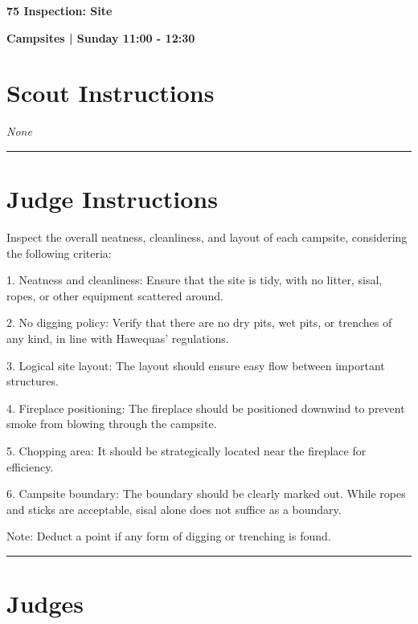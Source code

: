 \documentclass[10pt]{article}
\newcommand{\newtitle}[1]{\begin{center}{\Huge\bfseries #1 }\\ \vspace{5mm}\end{center}}
\newcommand{\newsubtitle}[1]{\begin{center}{\color{grey}\Large\bfseries #1 }\\ \vspace{5mm}\end{center}}
\begin{document}
	\vspace{1cm}


	\clearpage
		\newtitle{75 Inspection: Site }
	\newsubtitle{Campsites | Sunday 11:00 - 12:30}
		\setcounter{section}{74}
	\section*{Scout Instructions}
		\textit{None}
	
	\vspace{0.5cm}
	\hrule
	\vspace{0.5cm}

		\section*{Judge Instructions}
		Inspect the overall neatness, cleanliness, and layout of each campsite, considering the following criteria:



1. Neatness and cleanliness: Ensure that the site is tidy, with no litter, sisal, ropes, or other equipment scattered around.

2. No digging policy: Verify that there are no dry pits, wet pits, or trenches of any kind, in line with Hawequas' regulations.

3. Logical site layout: The layout should ensure easy flow between important structures. 

4. Fireplace positioning: The fireplace should be positioned downwind to prevent smoke from blowing through the campsite.

5. Chopping area: It should be strategically located near the fireplace for efficiency.

6. Campsite boundary: The boundary should be clearly marked out. While ropes and sticks are acceptable, sisal alone does not suffice as a boundary.



Note: Deduct a point if any form of digging or trenching is found.


\vspace{0.5cm}
	\hrule
	\vspace{0.5cm}
		\section*{\faUsers \: Judges}

		
\end{document}
